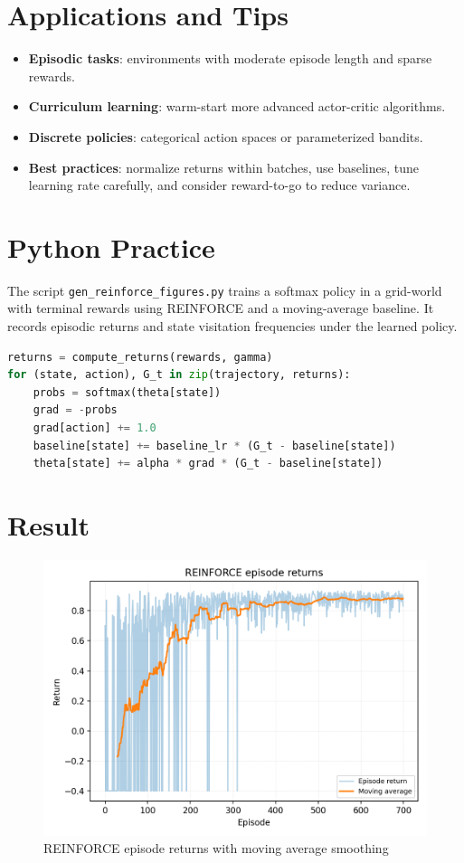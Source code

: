﻿\documentclass[12pt]{article}
\begin{document}
\section{Applications and Tips}
\begin{itemize}
  \item \textbf{Episodic tasks}: environments with moderate episode length and sparse rewards.
  \item \textbf{Curriculum learning}: warm-start more advanced actor-critic algorithms.
  \item \textbf{Discrete policies}: categorical action spaces or parameterized bandits.
  \item \textbf{Best practices}: normalize returns within batches, use baselines, tune learning rate carefully, and consider reward-to-go to reduce variance.
\end{itemize}

\section{Python Practice}
The script \texttt{gen\_reinforce\_figures.py} trains a softmax policy in a grid-world with terminal rewards using REINFORCE and a moving-average baseline. It records episodic returns and state visitation frequencies under the learned policy.
\begin{lstlisting}[language=Python,caption={Excerpt from gen_reinforce_figures.py}]
returns = compute_returns(rewards, gamma)
for (state, action), G_t in zip(trajectory, returns):
    probs = softmax(theta[state])
    grad = -probs
    grad[action] += 1.0
    baseline[state] += baseline_lr * (G_t - baseline[state])
    theta[state] += alpha * grad * (G_t - baseline[state])
\end{lstlisting}

\section{Result}
\begin{figure}[H]
  \centering
  \includegraphics[width=0.8\linewidth]{reinforce_returns.png}
  \caption{REINFORCE episode returns with moving average smoothing}
  \label{fig:reinforce_returns}
\end{figure}
\end{document}
